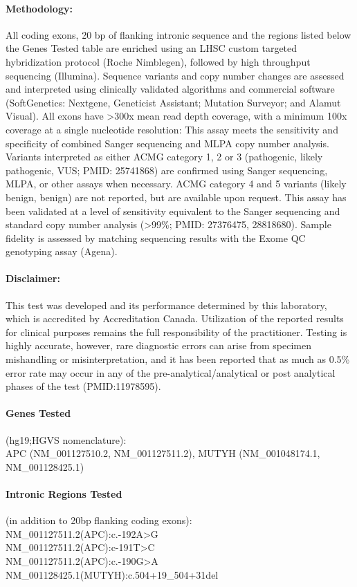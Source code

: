 \documentclass[9pt]{extarticle}
\begin{document}
\paragraph{Methodology:} All coding exons, 20 bp of flanking intronic sequence and the regions listed below the Genes Tested table are enriched using an LHSC custom targeted hybridization protocol (Roche Nimblegen), followed by high throughput sequencing (Illumina). Sequence variants and copy number changes are assessed and interpreted using clinically validated algorithms and commercial software (SoftGenetics: Nextgene, Geneticist Assistant; Mutation Surveyor; and Alamut Visual). All exons have >300x mean read depth coverage, with a minimum 100x coverage at a single nucleotide resolution: This assay meets the sensitivity and specificity of combined Sanger sequencing and MLPA copy number analysis. Variants interpreted as either ACMG category 1, 2 or 3 (pathogenic, likely pathogenic, VUS; PMID: 25741868) are confirmed using Sanger sequencing, MLPA, or other assays when necessary. ACMG category 4 and 5 variants (likely benign, benign) are not reported, but are available upon request. This assay has been validated at a level of sensitivity equivalent to the Sanger sequencing and standard copy number analysis (>99\%; PMID: 27376475, 28818680). Sample fidelity is assessed by matching sequencing results with the Exome QC genotyping assay (Agena).

\paragraph{Disclaimer:} This test was developed and its performance determined by this laboratory, which is accredited by Accreditation Canada. Utilization of the reported results for clinical purposes remains the full responsibility of the practitioner. Testing is highly accurate, however, rare diagnostic errors can arise from specimen mishandling or misinterpretation, and it has been reported that as much as 0.5\% error rate may occur in any of the pre-analytical/analytical or post analytical phases of the test (PMID:11978595).

\paragraph{Genes Tested} (hg19;HGVS nomenclature): \\
APC (NM\_001127510.2, NM\_001127511.2), MUTYH (NM\_001048174.1, NM\_001128425.1)

\paragraph{Intronic Regions Tested} (in addition to 20bp flanking coding exons): \\
NM\_001127511.2(APC):c.-192A>G \\
NM\_001127511.2(APC):c-191T>C \\
NM\_001127511.2(APC):c.-190G>A \\
NM\_001128425.1(MUTYH):c.504+19\_504+31del
\vspace{1em}
\end{document}

